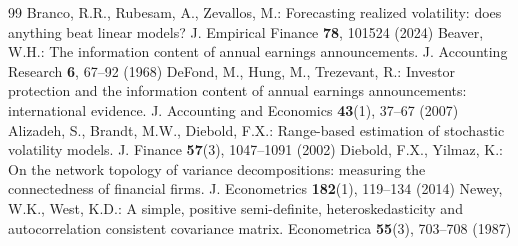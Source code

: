 \documentclass[runningheads,a4paper]{llncs}
\begin{document}
\begin{thebibliography}{99}
 Branco, R.R., Rubesam, A., Zevallos, M.: Forecasting realized volatility: does anything beat linear models? J. Empirical Finance \textbf{78}, 101524 (2024)
 Beaver, W.H.: The information content of annual earnings announcements. J. Accounting Research \textbf{6}, 67--92 (1968)
 DeFond, M., Hung, M., Trezevant, R.: Investor protection and the information content of annual earnings announcements: international evidence. J. Accounting and Economics \textbf{43}(1), 37--67 (2007)
 Alizadeh, S., Brandt, M.W., Diebold, F.X.: Range-based estimation of stochastic volatility models. J. Finance \textbf{57}(3), 1047--1091 (2002)
 Diebold, F.X., Yilmaz, K.: On the network topology of variance decompositions: measuring the connectedness of financial firms. J. Econometrics \textbf{182}(1), 119--134 (2014)
 Newey, W.K., West, K.D.: A simple, positive semi-definite, heteroskedasticity and autocorrelation consistent covariance matrix. Econometrica \textbf{55}(3), 703--708 (1987)
\end{thebibliography}
\end{document}

